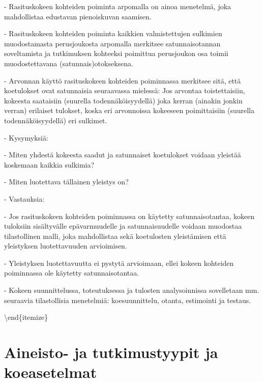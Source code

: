 \documentclass[
]{book}
\begin{document}
\begin{itemize}
\begin{itemize}
\begin{itemize}
\begin{itemize}
\begin{itemize}
- Rasituskokeen kohteiden poiminta arpomalla on ainoa menetelmä, joka mahdollistaa edustavan pienoiskuvan saamisen.

- Rasituskokeen kohteiden poiminta kaikkien valmistettujen sulkimien muodostamasta perusjoukosta arpomalla merkitsee satunnaisotannan soveltamista ja tutkimuksen kohteeksi poimittua perusjoukon osa toimii muodostettavana (satunnais)otokseksena.

\end{itemize}

- Arvonnan käyttö rasituskokeen kohteiden poiminnassa merkitsee sitä, että koetulokset ovat satunnaisia seuraavassa mielessä: Jos arvontaa toistettaisiin, kokeesta saataisiin (suurella todennäköisyydellä) joka kerran (ainakin jonkin verran) erilaiset tulokset, koska eri arvonnoissa kokeeseen poimittaisiin (suurella todennäköisyydellä) eri sulkimet.

- Kysymyksiä:

\begin{itemize}

- Miten yhdestä kokeesta saadut ja satunnaiset koetulokset voidaan yleistää koskemaan kaikkia sulkimia?

- Miten luotettava tällainen yleistys on?

\end{itemize}

- Vastauksia:

\begin{itemize}

- Jos rasituskokeen kohteiden poiminnassa on käytetty satunnaisotantaa, kokeen tuloksiin sisältyvälle epävarmuudelle ja satunnaisuudelle voidaan muodostaa tilastollinen malli, joka mahdollistaa sekä koetulosten yleistämisen että yleistyksen luotettavuuden arvioimisen.

- Yleistyksen luotettavuutta ei pystytä arvioimaan, ellei kokeen kohteiden poiminnassa ole käytetty satunnaisotantaa.

- Kokeen suunnittelussa, toteutuksessa ja tulosten analysoinnissa sovelletaan mm. seuraavia tilastollisia menetelmiä: koesuunnittelu, otanta, estimointi ja testaus.

\end{itemize}

\end{itemize}

\textbackslash end\{itemize\}

\hypertarget{luku10}{%
\chapter{Aineisto- ja tutkimustyypit ja koeasetelmat}\label{luku10}}


\end{itemize}
\end{itemize}
\end{itemize}
\end{document}
